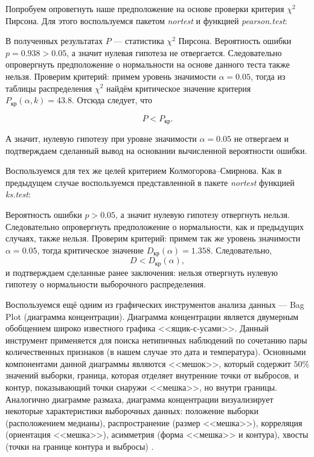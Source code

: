 Попробуем опровегнуть наше предположение на основе проверки критерия $\chi^2$ Пирсона. Для этого воспользуемся пакетом \textit{nortest} и функцией \textit{pearson.test}:

В полученных результатах $P$ --- статистика $\chi^2$ Пирсона. Вероятность ошибки $p = 0.938 > 0.05$, а значит нулевая гипотеза не отвергается. Следовательно опровергнуть предположение о нормальности на основе данного теста также нельзя. Проверим критерий: примем уровень значимости $\alpha = 0.05$, тогда из таблицы распределения $\chi^2$ найдём критическое значение критерия $P_{\textrm{кр}}(\alpha, k) = 43.8$. Отсюда следует, что

\begin{equation*}
	P < P_{\textrm{кр}}.
\end{equation*}

А значит, нулевую гипотезу при уровне значимости $\alpha = 0.05$ не отвергаем и подтверждаем сделанный вывод на основании вычисленной вероятности ошибки. 

Воспользуемся для тех же целей критерием Колмогорова--Смирнова. Как в предыдущем случае воспользуемся представленной в пакете \textit{nortest} функцией \textit{ks.test}:

Вероятность ошибки $p > 0.05$, а значит нулевую гипотезу отвергнуть нельзя. Следовательно опровергнуть предположение о нормальности, как и предыдущих случаях, также нельзя. Проверим критерий: примем так же уровень значимости $\alpha = 0.05$, тогда критическое значение $D_{\textrm{кр}}(\alpha) = 1.358$. Следовательно,
\begin{equation*}
	D < D_{\textrm{кр}}(\alpha),
\end{equation*}
и подтверждаем сделанные ранее заключения: нельзя отвергнуть нулевую гипотезу о нормальности выборочного распределения.

Воспользуемся ещё одним из графических инструментов анализа данных --- Bag Plot (диаграмма концентрации). 
Диаграмма концентрации является двумерным обобщением широко известного графика <<ящик-с-усами>>. Данный инструмент применяется для поиска нетипичных наблюдений по сочетанию пары количественных признаков (в нашем случае это дата и температура). Основными компонентами данной диаграммы являются <<мешок>>, который содержит $50\%$ значений выборки, граница, которая отделяет внутренние точки от выбросов, и контур, показывающий точки снаружи <<мешка>>, но внутри границы. Аналогично диаграмме размаха, диаграмма концентрации визуализирует некоторые характеристики выборочных данных: положение выборки (расположением медианы), распространение (размер <<мешка>>), корреляция (ориентация <<мешка>>), асимметрия (форма <<мешка>> и контура), хвосты (точки на границе контура и выбросы) \cite{Rousseeuw1999Bagplot}.

